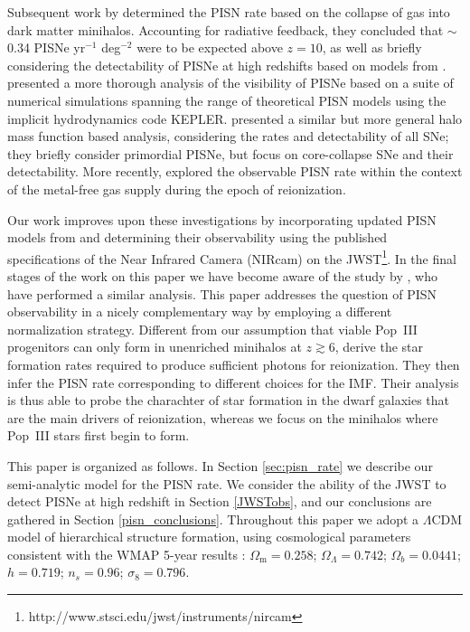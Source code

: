 \documentclass[../thesis.tex]{subfiles}
\begin{document}
Subsequent work by \citet{WiseAbel2005} determined the PISN rate based
on the collapse of gas into dark matter minihalos. Accounting for
radiative feedback, they concluded that $\sim$0.34 PISNe yr$^{-1}$
deg$^{-2}$ were to be expected above $z=10$, as well as briefly
considering the detectability of PISNe at high redshifts based on
models from \citet{HegerWoosley2002}.  \citet{Scannapiecoetal2005}
presented a more thorough analysis of the visibility of PISNe based
on a suite of numerical simulations spanning the range of theoretical
PISN models using the implicit hydrodynamics code
KEPLER. \citet{MesingerJohnsonHaiman2006} presented a similar but more
general halo mass function based analysis, considering the rates and
detectability of all SNe; they briefly consider primordial PISNe, but
focus on core-collapse SNe and their detectability.  More recently,
\citet{TrentiStiavelliShull2009} explored the observable PISN rate
within the context of the metal-free gas supply during the epoch of
reionization.

Our work improves upon these investigations by incorporating updated
PISN models from \citet{KasenWoosleyHeger2011} and determining their
observability using the published specifications of the Near Infrared
Camera (NIRcam) on the
JWST\footnote{http://www.stsci.edu/jwst/instruments/nircam}.
In the final stages of the work on this paper we have become aware of
the study by \citet{PanKasenLoeb2012}, who have performed a similar
analysis. This paper addresses the question of PISN observability in a
nicely complementary way by employing a different normalization
strategy. Different from our assumption that viable Pop~III
progenitors can only form in unenriched minihalos at $z\gtrsim6$,
\citet{PanKasenLoeb2012} derive the star formation rates required to
produce sufficient photons for reionization.  They then infer the PISN
rate corresponding to different choices for the IMF.  Their analysis
is thus able to probe the charachter of star formation in the dwarf
galaxies that are the main drivers of reionization, whereas we focus
on the minihalos where Pop~III stars first begin to form.

This paper is organized as follows.  In Section \ref{sec:pisn_rate} we describe our
semi-analytic model for the PISN rate.  We consider the ability of the
JWST to detect PISNe at high redshift in Section \ref{JWSTobs}, and our
conclusions are gathered in Section \ref{pisn_conclusions}.  Throughout this paper we adopt
a $\Lambda$CDM model of hierarchical structure formation, using
cosmological parameters consistent with the WMAP 5-year results
\citep{Komatsu2009}: $\Omega_{\mathrm m} = 0.258$; $\Omega_{\Lambda}=0.742$;
$\Omega_b=0.0441$; $h=0.719$; $n_s=0.96$; $\sigma_8=0.796$.
\end{document}
